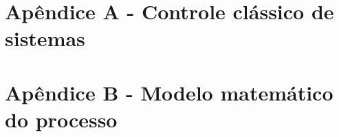 \documentclass[12pt, a4paper]{report}
\begin{document}






\appendix

\chapter[Apêndice A - Controle clássico de sistemas]{Apêndice A - Controle clássico de sistemas}
\newpage


\chapter[Apêndice B - Modelo matemático do processo]{Apêndice B - Modelo matemático do processo}
\newpage

\end{document}
